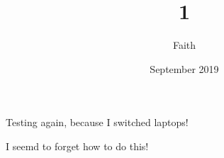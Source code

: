 \documentclass{article}
\title{1}
\author{Faith}
\date{September 2019}
\begin{document}
\maketitle
Testing again, because I switched laptops!

I seemd to forget how to do this!
\end{document}
